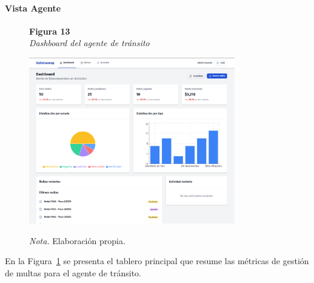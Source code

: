 \paragraph{Vista Agente}
\begin{figure}[htbp]
    \begin{flushleft}
        \textbf{Figura 13}\\[2em]
        \textit{Dashboard del agente de tránsito}
    \end{flushleft}
    \vspace{1em}
    \centering
    \includegraphics[width=0.8\textwidth]{Images/UI3.png}
    \vspace{2em}
    \begin{flushleft}
        \textit{Nota.} Elaboración propia.
    \end{flushleft}
    \label{fig:dashboard_agente}
\end{figure}
En la Figura~\ref{fig:dashboard_agente} se presenta el tablero principal que resume las métricas de gestión de multas para el agente de tránsito.
